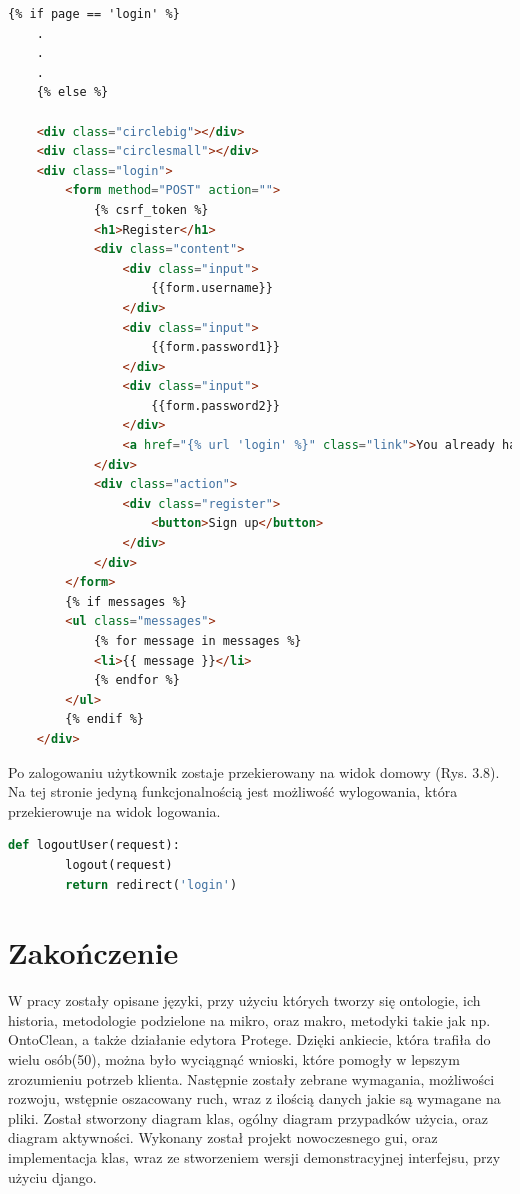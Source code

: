 \documentclass[a4paper,12pt, twoside]{book} %
\begin{document}
\begin{lstlisting}[language=html, basicstyle=\small, breaklines=true, caption={Przykłaad okna rejestracji w htmlu},  label={lst:class}]
	{% if page == 'login' %}
	.
	.
	.
	{% else %}
	
	<div class="circlebig"></div>
	<div class="circlesmall"></div>
	<div class="login">
		<form method="POST" action="">
			{% csrf_token %}
			<h1>Register</h1>
			<div class="content">
				<div class="input">
					{{form.username}}
				</div>
				<div class="input">
					{{form.password1}}
				</div>
				<div class="input">
					{{form.password2}}
				</div>
				<a href="{% url 'login' %}" class="link">You already have an account?</a>
			</div>
			<div class="action">
				<div class="register">
					<button>Sign up</button>
				</div>
			</div>
		</form>
		{% if messages %}
		<ul class="messages">
			{% for message in messages %}
			<li>{{ message }}</li>
			{% endfor %}
		</ul>
		{% endif %}
	</div>
\end{lstlisting}

Po zalogowaniu użytkownik zostaje przekierowany na widok domowy (Rys. 3.8). Na tej stronie jedyną funkcjonalnością jest możliwość wylogowania, która przekierowuje na widok logowania.

\begin{lstlisting}[language=Python, basicstyle=\small, breaklines=true, caption={Przykłaad funkcji wylogowania},  label={lst:class}]
	def logoutUser(request):
		logout(request)
		return redirect('login')
\end{lstlisting}

\chapter*{Zakończenie}
W pracy zostały opisane języki, przy użyciu których tworzy się ontologie, ich historia, metodologie podzielone na mikro, oraz makro, metodyki takie jak np. OntoClean, a także działanie edytora Protege.
Dzięki ankiecie, która trafiła do wielu osób(50), można było wyciągnąć wnioski, które pomogły w lepszym zrozumieniu potrzeb klienta. Następnie zostały zebrane wymagania, możliwości rozwoju, wstępnie oszacowany ruch, wraz z ilością danych jakie są wymagane na pliki. Został stworzony diagram klas, ogólny diagram przypadków użycia, oraz diagram aktywności. Wykonany został projekt nowoczesnego gui, oraz implementacja klas, wraz ze stworzeniem wersji demonstracyjnej interfejsu, przy użyciu django.
\end{document}
